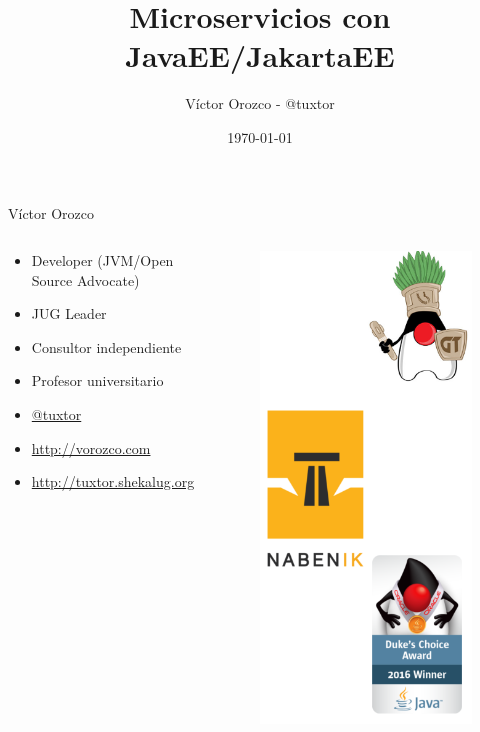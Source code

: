 \documentclass{beamer}
\title{Microservicios con JavaEE/JakartaEE}
\author{Víctor Orozco - @tuxtor}
\institute{GuateJUG}
\date{\today}
\begin{document}
\frame{\titlepage}

\begin{frame}{Víctor Orozco}
\begin{columns}[T] %
	\begin{column}[T]{5cm} %
		\begin{itemize}
			\item Developer (JVM/Open Source Advocate)
			\item JUG Leader
			\item Consultor independiente
			\item Profesor universitario
			\item \href{https://twitter.com/tuxtor}{@tuxtor}
			\item \href{http://vorozco.com}{http://vorozco.com}
			\item \href{http://tuxtor.shekalug.org}{http://tuxtor.shekalug.org} 
		\end{itemize}
	\end{column}
	\begin{column}[T]{5cm} %
		\begin{figure}
			\centering
			\includegraphics[width=0.6\linewidth]{Images/logos}
		\end{figure}
		
	\end{column}
\end{columns}
\end{frame}
\end{document}
